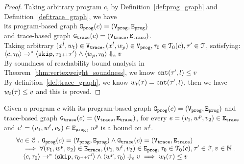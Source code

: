 \begin{proof}
Taking arbitrary program $c$,
by Definition~\ref{def:prog_graph} and Definition~\ref{def:trace_graph}, 
we have   
\\
its program-based graph $\mathtt{{G_{prog}}}({c}) = (\mathtt{{V_{prog}}}, \mathtt{{E_{prog}}})$ 
\\
and 
trace-based graph $\mathtt{{G_{trace}}}({c}) = (\mathtt{{V_{trace}}}, \mathtt{{E_{trace}}})$.
\\
Taking arbitrary 
$(x^l, w_{t}) \in \mathtt{{V_{trace}}}, (x^l, w_{p}) \in \mathtt{{V_{prog}}}, \mathtt{\tau}_0 \in \mathcal{T}_0(c), \mathtt{\tau}' \in \mathcal{T}$, satisfying:
\\
$\langle {c}, \mathtt{\tau}_0 \rangle \to^{*} \langle \mathtt{skip}, \mathtt{\tau}_0 {\scriptscriptstyle ++}\mathtt{\tau}' \rangle 
\land 
\langle w_{p}, \mathtt{\tau}_0 \rangle \Downarrow_e v$
\\
By soundness of reachability bound analysis in Theorem~\ref{thm:vertexweight_soundness}, we know 
$\mathtt{cnt}(\mathtt{\tau}', l) \leq v$
\\
By definition~\ref{def:trace_graph}, we know $w_t(\mathtt{\tau}) = \mathtt{cnt}(\mathtt{\tau}', l)$,
then we have $w_t(\mathtt{\tau}) \leq v$ and this is proved.
\end{proof}
%
\begin{lem}
	\label{lem:edgeweights_map}
	Given a program $c$ with its
	program-based graph $\mathtt{{G_{prog}}}({c}) = (\mathtt{{V_{prog}}}, \mathtt{{E_{prog}}})$
	and 
	trace-based graph $\mathtt{{G_{trace}}}({c}) = (\mathtt{{V_{trace}}}, \mathtt{{E_{trace}}})$,
	for every $e = (v_1, w^p, v_2) \in \mathtt{{E_{trace}}}$ and
	$e' = (v_1, w^t, v_2) \in \mathtt{{E_{prog}}}$, 
	$w^{p}$ is a bound on $w^t$.
	\[
		\begin{array}{l}
			\forall c \in \mathcal{C} 
			 ~.~ 
			 \mathtt{{G_{prog}}}({c}) = (\mathtt{{V_{prog}}}, \mathtt{{E_{prog}}})
			\land 
			\mathtt{{G_{trace}}}({c}) = (\mathtt{{V_{trace}}}, \mathtt{{E_{trace}}})
			\\ \quad
			\implies
			\forall (v_1, w^p, v_2) \in \mathtt{{E_{trace}}},
			(v_1, w^t, v_2) \in \mathtt{{E_{prog}}}, 
			\mathtt{\tau}_0 \in \mathcal{T}_0(c), 
			\mathtt{\tau}' \in \mathcal{T}, v \in \mathbb{N} ~.~
			\\ \quad
			\langle {c}, \mathtt{\tau}_0 \rangle \to^{*} \langle \mathtt{skip}, \mathtt{\tau}_0 {\scriptscriptstyle ++}\mathtt{\tau}' \rangle 
			\land 
			\langle w^{p}, \mathtt{\tau}_0 \rangle \Downarrow_e v
			\implies
			w_{t}(\mathtt{\tau}) \leq v
		\end{array}
		\]
	\end{lem}
